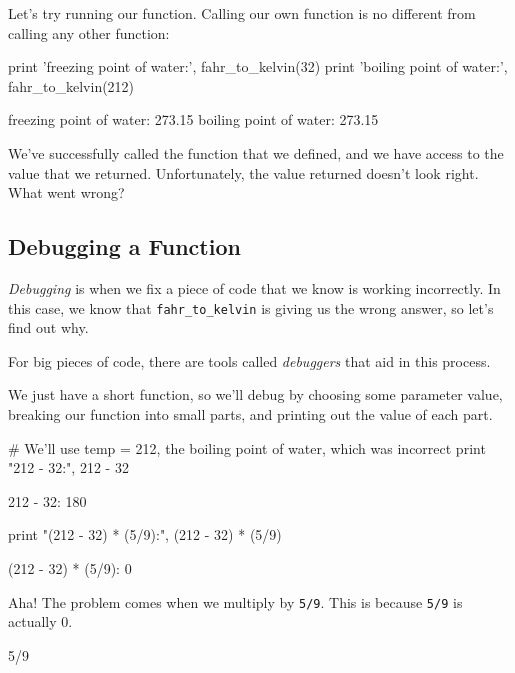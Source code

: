 \documentclass{book}
\begin{document}
Let's try running our function. Calling our own function is no different
from calling any other function:

\begin{VerbIn}
print 'freezing point of water:', fahr_to_kelvin(32)
print 'boiling point of water:', fahr_to_kelvin(212)
\end{VerbIn}

\begin{VerbOut}
freezing point of water: 273.15
boiling point of water: 273.15
\end{VerbOut}

We've successfully called the function that we defined, and we have
access to the value that we returned. Unfortunately, the value returned
doesn't look right. What went wrong?

\subsection{Debugging a Function}

\emph{Debugging} is when we fix a piece of code that we know is working
incorrectly. In this case, we know that \texttt{fahr\_to\_kelvin} is
giving us the wrong answer, so let's find out why.

For big pieces of code, there are tools called \emph{debuggers} that aid
in this process.

We just have a short function, so we'll debug by choosing some parameter
value, breaking our function into small parts, and printing out the
value of each part.

\begin{VerbIn}
# We'll use temp = 212, the boiling point of water, which was incorrect
print "212 - 32:", 212 - 32
\end{VerbIn}

\begin{VerbOut}
212 - 32: 180
\end{VerbOut}

\begin{VerbIn}
print "(212 - 32) * (5/9):", (212 - 32) * (5/9)
\end{VerbIn}

\begin{VerbOut}
(212 - 32) * (5/9): 0
\end{VerbOut}

Aha! The problem comes when we multiply by \texttt{5/9}. This is because
\texttt{5/9} is actually 0.

\begin{VerbIn}
5/9
\end{VerbIn}
\end{document}
